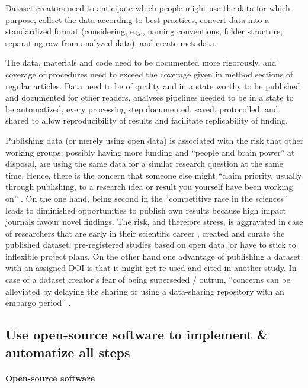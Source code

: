 %
Dataset creators need to anticipate which people might use the data for which
purpose, collect the data according to best practices, convert data into a
standardized format (considering, e.g., naming conventions, folder structure,
separating raw from analyzed data), and create metadata.

The data, materials and code need to be documented more rigorously, and coverage
of procedures need to exceed the coverage given in method sections of regular
articles.
%
Data need to be of quality and in a state worthy to be published and documented
for other readers, analyses pipelines needed to be in a state to be automatized,
every processing step documented, saved, protocolled, and shared to allow
reproducibility of results and facilitate replicability of finding.

%
Publishing data (or merely using open data) is associated with the risk that
other working groups, possibly having more funding and ``people and brain
power'' at disposal, are using the same data for a similar research question at
the same time.
%
Hence, there is the concern that someone else might ``claim priority, usually
through publishing, to a research idea or result you yourself have been working
on'' \citep{laine2017afraid}.
%
On the one hand, being second in the ``competitive race in the sciences'' leads
to diminished opportunities to publish own results because high impact journals
favour novel findings.
%
The risk, and therefore stress, is aggravated in case of researchers that are
early in their scientific career \citep[cf.][]{toribio2021early}, created and
curate the published dataset, pre-registered studies based on open data, or have
to stick to inflexible project plans.
%
On the other hand one advantage of publishing a dataset with an assigned DOI is
that it might get re-used and cited in another study.
%
In case of a dataset creator's fear of being superseded / outrun, ``concerns can
be alleviated by delaying the sharing or using a data-sharing repository with an
embargo period'' \citep{nichols2017best}.



\subsection{Use open-source software to implement \& automatize all steps}

\paragraph{Open-source software}

